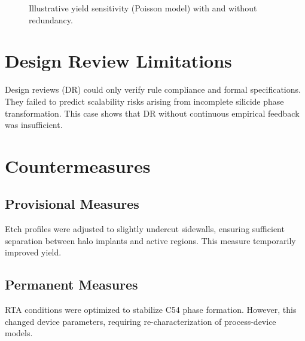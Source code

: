 \documentclass[conference]{IEEEtran}
\begin{document}
\begin{figure}[!t]
  \centering
  \caption{Illustrative yield sensitivity (Poisson model) with and without redundancy.}
  \label{fig:yield}
\end{figure}

\section{Design Review Limitations}
Design reviews (DR) could only verify rule compliance and formal specifications. 
They failed to predict scalability risks arising from incomplete silicide phase transformation. 
This case shows that DR without continuous empirical feedback was insufficient.

\section{Countermeasures}
\subsection{Provisional Measures}
Etch profiles were adjusted to slightly undercut sidewalls, ensuring sufficient separation between halo implants and active regions. 
This measure temporarily improved yield.

\subsection{Permanent Measures}
RTA conditions were optimized to stabilize C54 phase formation. 
However, this changed device parameters, requiring re-characterization of process-device models.
\end{document}
